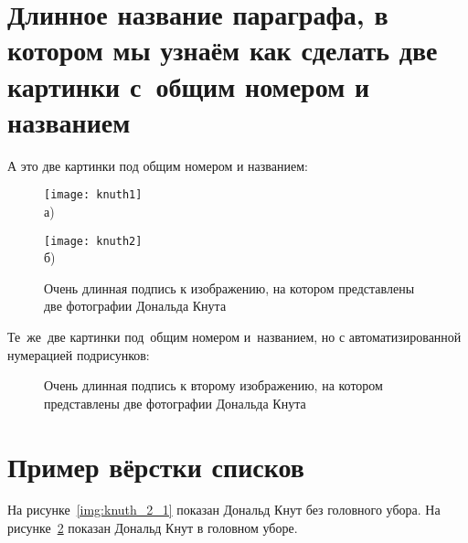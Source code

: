 \section{Длинное название параграфа, в котором мы узнаём как сделать две картинки с~общим номером и названием} \label{sect2_2}

А это две картинки под общим номером и названием:
\begin{figure}[ht]
  \begin{minipage}[ht]{0.49\linewidth}\centering
    \texttt{[image: knuth1]} \\ а)
  \end{minipage}
  \hfill
  \begin{minipage}[ht]{0.49\linewidth}\centering
    \texttt{[image: knuth2]} \\ б)
  \end{minipage}
  \caption{Очень длинная подпись к изображению, на котором представлены две фотографии Дональда Кнута}
  \label{img:knuth}
\end{figure}

Те~же~две картинки под~общим номером и~названием, но с автоматизированной нумерацией подрисунков:
\begin{figure}[ht]
    {\centering
        \hfill
        \hfill
        \hfill
        \hfill
    }
    \caption[Этот текст попадает в названия рисунков в списке рисунков]{Очень
    длинная подпись к второму изображению, на котором представлены две
    фотографии Дональда Кнута}
    \label{img:knuth_2}
\end{figure}

\section{Пример вёрстки списков} \label{sect2_3}


На рисунке~\ref{img:knuth_2_1} показан Дональд Кнут без головного убора. На рисунке~\ref{img:knuth_2}  показан Дональд Кнут в головном уборе.


